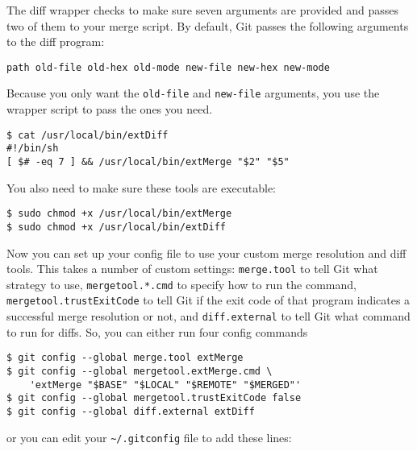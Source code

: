 \documentclass[a4paper]{book}
\newcounter{tab}[chapter]
\begin{document}
The diff wrapper checks to make sure seven arguments are provided and passes two of them to your merge script. By default, Git passes the following arguments to the diff program:

\begin{shaded}\begin{verbatim}
path old-file old-hex old-mode new-file new-hex new-mode
\end{verbatim}\end{shaded}

Because you only want the \texttt{old-file} and \texttt{new-file} arguments, you use the wrapper script to pass the ones you need.

\begin{shaded}\begin{verbatim}
$ cat /usr/local/bin/extDiff
#!/bin/sh
[ $# -eq 7 ] && /usr/local/bin/extMerge "$2" "$5"
\end{verbatim}\end{shaded}

You also need to make sure these tools are executable:

\begin{shaded}\begin{verbatim}
$ sudo chmod +x /usr/local/bin/extMerge
$ sudo chmod +x /usr/local/bin/extDiff
\end{verbatim}\end{shaded}

Now you can set up your config file to use your custom merge resolution and diff tools. This takes a number of custom settings: \texttt{merge.tool} to tell Git what strategy to use, \texttt{mergetool.*.cmd} to specify how to run the command, \texttt{mergetool.trustExitCode} to tell Git if the exit code of that program indicates a successful merge resolution or not, and \texttt{diff.external} to tell Git what command to run for diffs. So, you can either run four config commands

\begin{shaded}\begin{verbatim}
$ git config --global merge.tool extMerge
$ git config --global mergetool.extMerge.cmd \
    'extMerge "$BASE" "$LOCAL" "$REMOTE" "$MERGED"'
$ git config --global mergetool.trustExitCode false
$ git config --global diff.external extDiff
\end{verbatim}\end{shaded}

or you can edit your \texttt{\textasciitilde{}/.gitconfig} file to add these lines:
\end{document}
